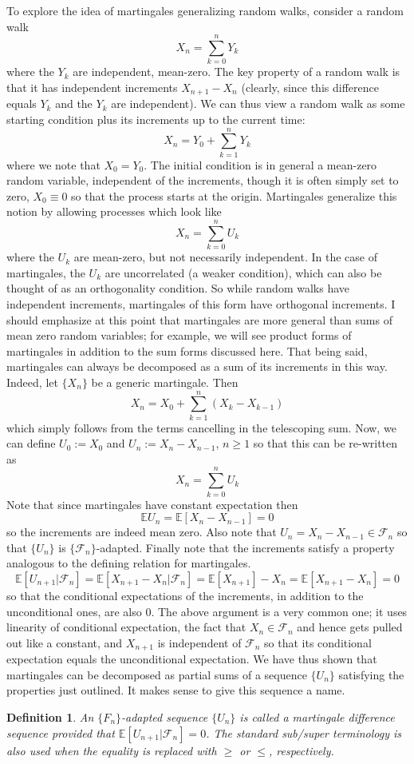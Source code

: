 \documentclass[12pt]{article}
\newcommand{\E}{\mathbb{E}}
\newtheorem{definition}{Definition}
\begin{document}
To explore the idea of martingales generalizing random walks, consider a random walk
\[X_n = \sum_{k = 0}^{n} Y_k\]
where the $Y_k$ are independent, mean-zero. The key property of a random walk is that it has independent increments $X_{n + 1} - X_n$ (clearly, since this difference equals $Y_k$ and the $Y_k$ are independent). We can thus 
view a random walk as some starting condition plus its increments up to the current time: 
\[X_n = Y_0 + \sum_{k = 1}^{n} Y_k\]
where we note that $X_0 = Y_0$. The initial condition is in general a mean-zero random variable, independent of the increments, though it is often simply set to zero, $X_0 \equiv 0$ so that the process starts at the origin. Martingales 
generalize this notion by allowing processes which look like 
\[X_n = \sum_{k = 0}^{n} U_k\]
where the $U_k$ are mean-zero, but not necessarily independent. In the case of martingales, the $U_k$ are uncorrelated (a weaker condition), which can also be thought of as an orthogonality condition. So while random walks have 
independent increments, martingales of this form have orthogonal increments. I should emphasize at this point that martingales are more general than sums of mean zero random variables; for example, we will see product forms of 
martingales in addition to the sum forms discussed here. That being said, martingales can always be decomposed as a sum of its increments in this way. Indeed, let $\{X_n\}$ be a generic martingale. Then 
\[X_n = X_0 + \sum_{k = 1}^{n} (X_k - X_{k-1})\]
which simply follows from the terms cancelling in the telescoping sum. Now, we can define $U_0 := X_0$ and $U_n := X_n - X_{n - 1}$, $n \geq 1$ so that this can be re-written as 
\[X_n = \sum_{k = 0}^{n} U_k\]
Note that since martingales have constant expectation then 
\[\E U_n = \E[X_n - X_{n-1}] = 0\]
so the increments are indeed mean zero. Also note that $U_n = X_n - X_{n-1} \in \mathcal{F}_n$ so that $\{U_n\}$ is $\{\mathcal{F}_n\}$-adapted. Finally note that the increments satisfy a property analogous to the defining relation for 
martingales. 
\[\E[U_{n + 1}|\mathcal{F}_n] = \E[X_{n + 1} - X_n|\mathcal{F}_n] = \E[X_{n + 1}] - X_n = \E[X_{n + 1} - X_n] = 0\]
so that the conditional expectations of the increments, in addition to the unconditional ones, are also $0$. The above argument is a very common one; it uses linearity of conditional expectation, the fact that $X_n \in \mathcal{F}_n$ and hence 
gets pulled out like a constant, and $X_{n + 1}$ is independent of $\mathcal{F}_n$ so that its conditional expectation equals the unconditional expectation. We have thus shown that martingales can be decomposed as partial sums of 
a sequence $\{U_n\}$ satisfying the properties just outlined. It makes sense to give this sequence a name. 

\begin{definition}
An $\{F_n\}$-adapted sequence $\{U_n\}$ is called a \textit{martingale difference sequence} provided that $\E[U_{n+1}|\mathcal{F}_n] = 0$. The standard sub/super terminology is also used when the equality is replaced with 
$\geq$ or $\leq$, respectively. 
\end{definition}
\end{document}
